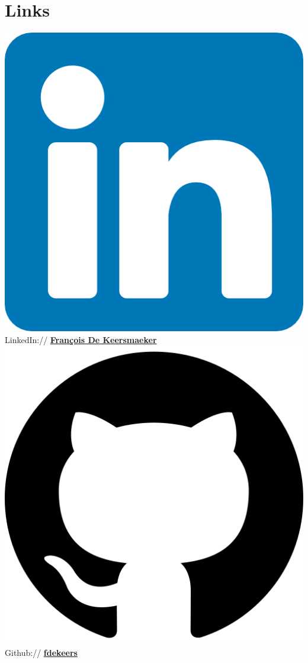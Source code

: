 \documentclass[]{deedy-resume-openfont}
\begin{document}
\begin{minipage}[t]{0.35\textwidth}

\section{Links} 
\includegraphics[scale=0.03]{images/linkedin.png} LinkedIn://  \href{https://www.linkedin.com/in/françois-de-keersmaeker-11301a210/}{\bf François De Keersmaeker} \\
\includegraphics[scale=0.03]{images/github.png} Github:// \href{https://github.com/fdekeers}{\bf fdekeers} \\

\end{minipage}
\end{document}

